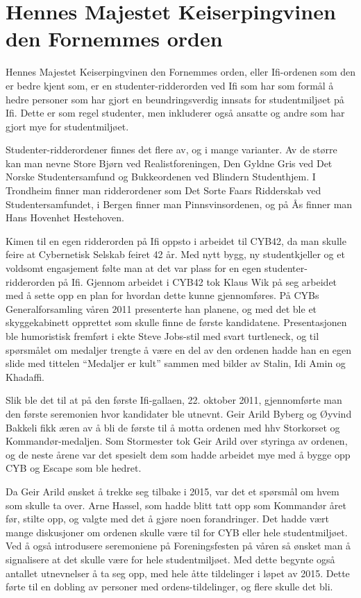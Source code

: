 \chapter[Ifi-ordenen]{Hennes Majestet Keiserpingvinen den Fornemmes orden}

\author{Skrevet av Arne Hassel}

Hennes Majestet Keiserpingvinen den Fornemmes orden, eller Ifi-ordenen som den er bedre kjent som, er en studenter-ridderorden ved Ifi som har som formål å hedre personer som har gjort en beundringsverdig innsats for studentmiljøet på Ifi. Dette er som regel studenter, men inkluderer også ansatte og andre som har gjort mye for studentmiljøet.

Studenter-ridderordener finnes det flere av, og i mange varianter. Av de større kan man nevne Store Bjørn ved Realistforeningen, Den Gyldne Gris ved Det Norske Studentersamfund og Bukkeordenen ved Blindern Studenthjem. I Trondheim finner man ridderordener som Det Sorte Faars Ridderskab ved Studentersamfundet, i Bergen finner man Pinnsvinsordenen, og på Ås finner man Hans Hovenhet Hestehoven.

Kimen til en egen ridderorden på Ifi oppsto i arbeidet til CYB42, da man skulle feire at Cybernetisk Selskab feiret 42 år. Med nytt bygg, ny studentkjeller og et voldsomt engasjement følte man at det var plass for en egen studenter-ridderorden på Ifi. Gjennom arbeidet i CYB42 tok Klaus Wik på seg arbeidet med å sette opp en plan for hvordan dette kunne gjennomføres. På CYBs Generalforsamling våren 2011 presenterte han planene, og med det ble et skyggekabinett opprettet som skulle finne de første kandidatene. Presentasjonen ble humoristisk fremført i ekte Steve Jobs-stil med svart turtleneck, og til spørsmålet om medaljer trengte å være en del av den ordenen hadde han en egen slide med tittelen ``Medaljer er kult'' sammen med bilder av Stalin, Idi Amin og Khadaffi.

Slik ble det til at på den første Ifi-gallaen, 22. oktober 2011, gjennomførte man den første seremonien hvor kandidater ble utnevnt. Geir Arild Byberg og Øyvind Bakkeli fikk æren av å bli de første til å motta ordenen med hhv Storkorset og Kommandør-medaljen. Som Stormester tok Geir Arild over styringa av ordenen, og de neste årene var det spesielt dem som hadde arbeidet mye med å bygge opp CYB og Escape som ble hedret.

Da Geir Arild ønsket å trekke seg tilbake i 2015, var det et spørsmål om hvem som skulle ta over. Arne Hassel, som hadde blitt tatt opp som Kommandør året før, stilte opp, og valgte med det å gjøre noen forandringer. Det hadde vært mange diskusjoner om ordenen skulle være til for CYB eller hele studentmiljøet. Ved å også introdusere seremoniene på Foreningsfesten på våren så ønsket man å signalisere at det skulle være for hele studentmiljøet. Med dette begynte også antallet utnevnelser å ta seg opp, med hele åtte tildelinger i løpet av 2015. Dette førte til en dobling av personer med ordens-tildelinger, og flere skulle det bli.

